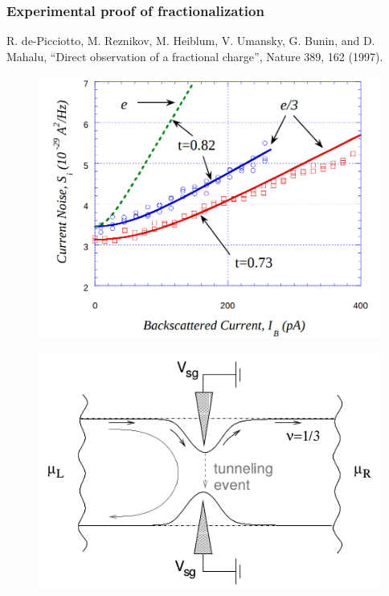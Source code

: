 \documentclass{beamer}
\begin{document}
\begin{frame}
\frametitle{Experimental proof of fractionalization}
\begin{center}


R. de-Picciotto, M. Reznikov, M. Heiblum, V. Umansky,
G. Bunin, and D. Mahalu, “Direct observation of a fractional charge”, Nature 389, 162 (1997).



\begin{minipage}[t]{0.60\linewidth}
\begin{figure}[!htb]
\centering
\includegraphics[scale=0.20]{shotnoise.png}
\end{figure}
\end{minipage}\hfill
\begin{minipage}[t]{0.40\linewidth}
\begin{figure}[!htb]
\centering
\includegraphics[scale=0.3]{backscatter.png}
\end{figure}
\end{minipage}

\end{center}
\end{frame}
\end{document}
